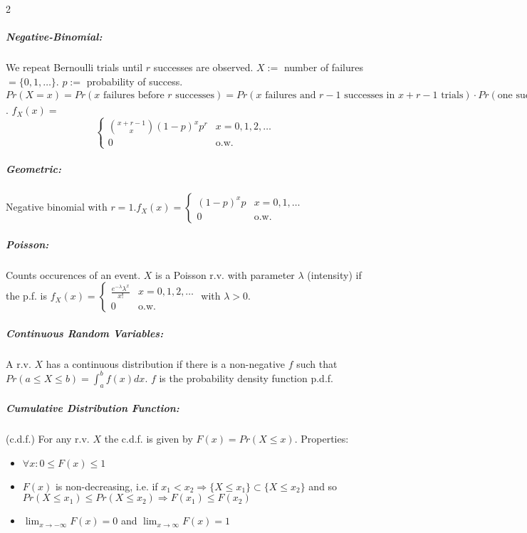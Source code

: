 \documentclass{article}[10pt]
\begin{document}
\begin{multicols}{2}
            \subparagraph*{Negative-Binomial: }
                    We repeat Bernoulli trials until $r$ successes are observed. $X :=$ number of failures $= \{0, 1, \ldots\}$. $p :=$ probability of success. $Pr(X = x) = Pr(x \text{ failures before $r$ successes}) = Pr(x \text{ failures and $r-1$ successes in $x + r - 1$ trials}) \cdot Pr(\text{one success in last trial}) = \left[{x+r-1 \choose x } (1-p)^x p^{r-1} \right] \cdot p = {x + r - 1 \choose x} (1 - p)^x p^r$. $f_X(x) = $ \[
                        \begin{cases}
                            {x+r-1 \choose x} (1-p)^x p^r   &   x=0,1,2,\ldots \\
                            0       & \text{o.w.}
                        \end{cases}
                    \]
            \subparagraph*{Geometric: }
                    Negative binomial with $r=1. f_X(x) = \begin{cases} (1-p)^x p & x=0,1,\ldots \\ 0 & \text{o.w.} \end{cases}$

            \subparagraph*{Poisson: }
                    Counts occurences of an event. $X$ is a Poisson r.v. with parameter $\lambda$ (intensity) if the p.f. is $f_X(x) = \begin{cases} \frac{e^{-\lambda}\lambda^x}{x!} & x=0,1,2,\ldots \\ 0 & \text{o.w.} \end{cases}$ with $\lambda>0$.
            \subparagraph*{Continuous Random Variables: }
                    A r.v. $X$ has a continuous distribution if there is a non-negative $f$ such that $Pr(a \leq X \leq b) = \int_{a}^{b} f(x)dx$. $f$ is the probability density function p.d.f. 
            \subparagraph*{Cumulative Distribution Function: } 
                    (c.d.f.) For any r.v. $X$ the c.d.f. is given by $F(x) = Pr(X \leq x)$. Properties: \begin{itemize}
                        \item[] $\forall x: 0 \leq F(x) \leq 1$
                        \item[] $F(x)$ is non-decreasing, i.e. if $x_1 < x_2 \Rightarrow \{X \leq x_1 \} \subset \{X \leq x_2 \}$ and so $Pr(X \leq x_1) \leq Pr(X \leq x_2) \Rightarrow F(x_1) \leq F(x_2)$
                        \item[] $\lim_{x \to -\infty} F(x) = 0$ and $\lim_{x \to \infty} F(x) = 1$
                    \end{itemize}
                \end{multicols}
\end{document}
